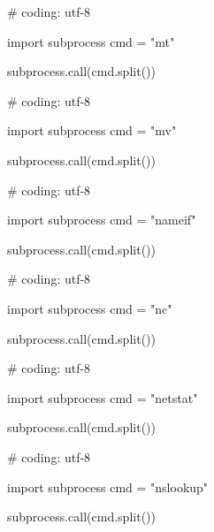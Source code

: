 \begin{mylisting}[label={lst:acpid},language=sh,caption=mt]

# coding: utf-8

import subprocess
cmd = "mt"

subprocess.call(cmd.split())

\end{mylisting}

\begin{mylisting}[label={lst:acpid},language=sh,caption=mv]

# coding: utf-8

import subprocess
cmd = "mv"

subprocess.call(cmd.split())

\end{mylisting}

\begin{mylisting}[label={lst:acpid},language=sh,caption=nameif]

# coding: utf-8

import subprocess
cmd = "nameif"

subprocess.call(cmd.split())

\end{mylisting}

\begin{mylisting}[label={lst:acpid},language=sh,caption=nc]

# coding: utf-8

import subprocess
cmd = "nc"

subprocess.call(cmd.split())

\end{mylisting}

\begin{mylisting}[label={lst:acpid},language=sh,caption=netstat]

# coding: utf-8

import subprocess
cmd = "netstat"

subprocess.call(cmd.split())

\end{mylisting}

\begin{mylisting}[label={lst:acpid},language=sh,caption=nslookup]

# coding: utf-8

import subprocess
cmd = "nslookup"

subprocess.call(cmd.split())

\end{mylisting}

